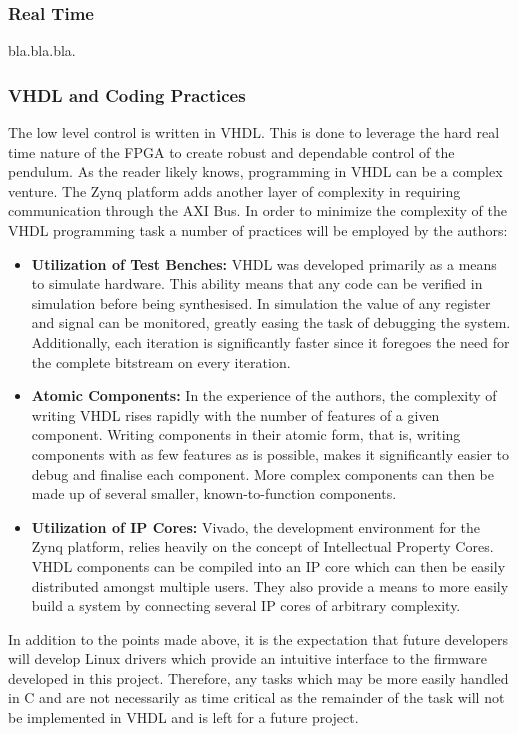 \subsubsection{Real Time} %
\label{ssub:real_time}
bla.bla.bla.

\subsubsection{VHDL and Coding Practices} %
\label{ssub:vhdl_and_coding_practices}
The low level control is written in VHDL.
This is done to leverage the hard real time nature of the FPGA to create robust and dependable control of the pendulum.
As the reader likely knows, programming in VHDL can be a complex venture.
The Zynq platform adds another layer of complexity in requiring communication through the AXI Bus.
In order to minimize the complexity of the VHDL programming task a number of practices will be employed by the authors:
\begin{itemize}
	\item \textbf{Utilization of Test Benches:} VHDL was developed primarily as a means to simulate hardware.
	This ability means that any code can be verified in simulation before being synthesised.
	In simulation the value of any register and signal can be monitored, greatly easing the task of debugging the system.
	Additionally, each iteration is significantly faster since it foregoes the need for the complete bitstream on every iteration.
	\item \textbf{Atomic Components:} In the experience of the authors, the complexity of writing VHDL rises rapidly with the number of features of a given component.
	Writing components in their atomic form, that is, writing components with as few features as is possible, makes it significantly easier to debug and finalise each component.
	More complex components can then be made up of several smaller, known-to-function components.
	\item \textbf{Utilization of IP Cores:} Vivado, the development environment for the Zynq platform, relies heavily on the concept of Intellectual Property Cores.
	VHDL components can be compiled into an IP core which can then be easily distributed amongst multiple users.
	They also provide a means to more easily build a system by connecting several IP cores of arbitrary complexity.
\end{itemize}
In addition to the points made above, it is the expectation that future developers will develop Linux drivers which provide an intuitive interface to the firmware developed in this project.
Therefore, any tasks which may be more easily handled in C and are not necessarily as time critical as the remainder of the task will not be implemented in VHDL and is left for a future project.


